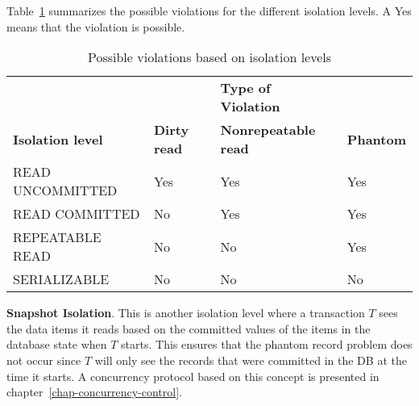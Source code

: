 Table~\ref{tab:chap20-isolation} summarizes the possible violations for the different isolation levels. A Yes means that the violation is possible. \\

\begin{table}[h!]
    \centering
    \bgroup
    \def\arraystretch{1.1}
    \begin{tabular}{llll}
         & & \textbf{Type of Violation} & \\\cline{2-4}
        \textbf{Isolation level} & \textbf{Dirty read} & \textbf{Nonrepeatable read} & \textbf{Phantom} \\
        READ UNCOMMITTED & Yes & Yes & Yes \\
        READ COMMITTED & No & Yes & Yes \\
        REPEATABLE READ & No & No & Yes \\
        SERIALIZABLE & No & No & No
    \end{tabular}
    \caption{Possible violations based on isolation levels}
    \label{tab:chap20-isolation}
    \egroup
\end{table}

\textbf{Snapshot Isolation}. This is another isolation level where a transaction $T$ sees the data items it reads based on the committed values of the items in the database state when $T$ starts. This ensures that the phantom record problem does not occur since $T$ will only see the records that were committed in the DB at the time it starts. A concurrency protocol based on this concept is presented in chapter~\ref{chap-concurrency-control}.
